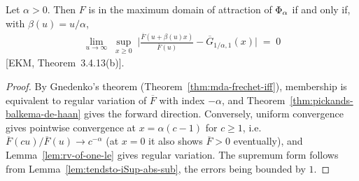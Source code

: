 \begin{theorem}
  \label{thm:pbdh-frechet-iff}
  \leanok
  Let $\alpha > 0$. Then $F$ is in the maximum domain of attraction of $\Phi_{\alpha}$ if
  and only if, with $\beta(u) = u/\alpha$,
  \begin{align*}
    \lim_{u \to \infty} \; \sup_{x \ge 0} \; \Big| \frac{\overline{F}(u + \beta(u) x)}{\overline{F}(u)}
      - \overline{G}_{1/\alpha, 1}(x) \Big| \; = \; 0
  \end{align*}
  [EKM, Theorem~3.4.13(b)].
\end{theorem}
\begin{proof}
  \leanok
  By Gnedenko's theorem (Theorem~\ref{thm:mda-frechet-iff}), membership is equivalent to
  regular variation of $\overline{F}$ with index $-\alpha$, and
  Theorem~\ref{thm:pickands-balkema-de-haan} gives the forward direction. Conversely, uniform
  convergence gives pointwise convergence at $x = \alpha(c - 1)$ for $c \ge 1$, i.e.\
  $\overline{F}(cu)/\overline{F}(u) \to c^{-\alpha}$ (at $x = 0$ it also shows $\overline{F} > 0$
  eventually), and Lemma~\ref{lem:rv-of-one-le} gives regular variation. The supremum form follows
  from Lemma~\ref{lem:tendsto-iSup-abs-sub}, the errors being bounded by $1$.
\end{proof}

